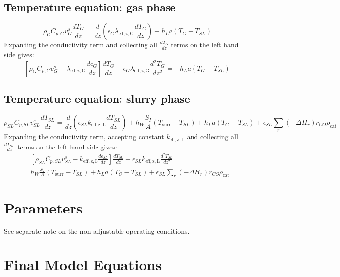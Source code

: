 \documentclass{article}
\begin{document}
\subsection{Temperature equation: gas phase}
\begin{equation}
	\rho_G C_{p,G} v_G^s\frac{dT_G}{dz} = \frac{d}{dz}\left(\epsilon_G \lambda_{\mathrm{eff,z,G}}\frac{dT_G}{dz} \right) - h_L a (T_G - T_{SL})
\end{equation}
Expanding the conductivity term and collecting all $\frac{d T_G}{dz}$ terms on the left hand side gives:
\begin{equation}
	\left[\rho_G C_{p,G} v_G^s - \lambda_{\mathrm{eff,z,G}}\frac{d\epsilon_G}{dz} \right]\frac{dT_G}{dz} - \epsilon_G \lambda_{\mathrm{eff,z,G}}\frac{d^2T_G}{dz^2} =- h_L a (T_G - T_{SL})
\end{equation}

\subsection{Temperature equation: slurry phase}
\begin{equation}
	\rho_{SL} C_{p,SL} v_{SL}^s\frac{d T_{SL}}{dz} = \frac{d}{dz}\left(\epsilon_{SL}k_{\mathrm{eff,z,L}}\frac{d T_{SL}}{dz}\right) + h_W\frac{S_I}{A}(T_{\mathrm{surr}}-T_{SL}) + h_L a (T_G - T_{SL}) + \epsilon_{SL}\sum_r (-\Delta H_r)r_{CO}\rho_{\mathrm{cat}}
\end{equation}
Expanding the conductivity term, accepting constant $k_{\mathrm{eff,z,L}}$ and collecting all $\frac{dT_{SL}}{dz}$ terms on the left hand side gives:
\begin{equation}
	\begin{split}
	&\left[\rho_{SL}C_{p,SL}v_{SL}^s -k_{\mathrm{eff,z,L}}\frac{d \epsilon_{SL}}{dz}\right]\frac{d T_{SL}}{dz} - \epsilon_{SL}k_{\mathrm{eff,z,L}}\frac{d^2T_{SL}}{dz^2} =\\
	& h_W\frac{S_I}{A}(T_{\mathrm{surr}}-T_{SL}) + h_L a (T_G - T_{SL}) + \epsilon_{SL}\sum_r (-\Delta H_r)r_{CO}\rho_{\mathrm{cat}}
	\end{split}
\end{equation}

\section{Parameters}
See separate note on the non-adjustable operating conditions.

\section{Final Model Equations}
\end{document}
